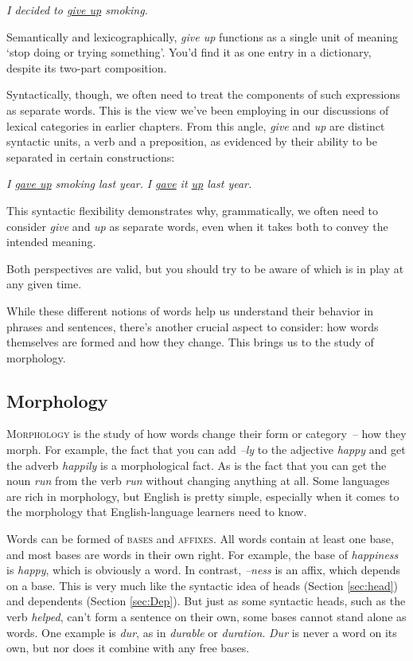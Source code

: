 \ea \textit{I decided to \uline{give up} smoking.}
\z

\noindent Semantically and lexicographically, \textit{give up} functions as a single unit of meaning `stop doing or trying something'. You'd find it as one entry in a dictionary, despite its two-part composition.

Syntactically, though, we often need to treat the components of such expressions as separate words. This is the view we've been employing in our discussions of lexical categories in earlier chapters. From this angle, \textit{give} and \textit{up} are distinct syntactic units, a verb and a preposition, as evidenced by their ability to be separated in certain constructions:

\ea
\ea \textit{I \uline{gave up} smoking last year.}
\ex \textit{I \uline{gave} it \uline{up} last year.}
\z\z

This syntactic flexibility demonstrates why, grammatically, we often need to consider \textit{give} and \textit{up} as separate words, even when it takes both to convey the intended meaning.

Both perspectives are valid, but you should try to be aware of which is in play at any given time.

While these different notions of words help us understand their behavior in phrases and sentences, there's another crucial aspect to consider: how words themselves are formed and how they change. This brings us to the study of morphology.

\subsection{Morphology} \label{sec:morphology}

\textsc{Morphology} is the study of how words change their form or category~-- how they morph. For example, the fact that you can add \textit{--ly} to the adjective \textit{happy} and get the adverb \textit{happily} is a morphological fact. As is the fact that you can get the noun \textit{run} from the verb \textit{run} without changing anything at all. Some languages are rich in morphology, but English is pretty simple, especially when it comes to the morphology that English-language learners need to know.

Words can be formed of \textsc{bases} and \textsc{affixes}. All words contain at least one base, and most bases are words in their own right. For example, the base of \textit{happiness} is \textit{happy}, which is obviously a word. In contrast, \textit{--ness} is an affix, which depends on a base. This is very much like the syntactic idea of heads (Section \ref{sec:head}) and dependents (Section \ref{sec:Dep}). But just as some syntactic heads, such as the verb \textit{helped}, can't form a sentence on their own, some bases cannot stand alone as words. One example is \textit{dur}, as in \textit{durable} or \textit{duration}. \textit{Dur} is never a word on its own, but nor does it combine with any free bases.

